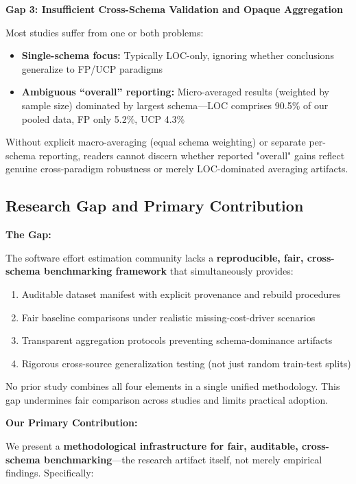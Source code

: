 \documentclass[11pt,a4paper]{article}
\begin{document}
\textbf{Gap 3: Insufficient Cross-Schema Validation and Opaque Aggregation}

Most studies suffer from one or both problems:
\begin{itemize}
    \item \textbf{Single-schema focus:} Typically LOC-only, ignoring whether conclusions generalize to FP/UCP paradigms
    \item \textbf{Ambiguous ``overall'' reporting:} Micro-averaged results (weighted by sample size) dominated by largest schema---LOC comprises 90.5\% of our pooled data, FP only 5.2\%, UCP 4.3\%
\end{itemize}

Without explicit macro-averaging (equal schema weighting) or separate per-schema reporting, readers cannot discern whether reported "overall" gains reflect genuine cross-paradigm robustness or merely LOC-dominated averaging artifacts.

\subsection{Research Gap and Primary Contribution}

\textbf{The Gap:}

The software effort estimation community lacks a \textbf{reproducible, fair, cross-schema benchmarking framework} that simultaneously provides:
\begin{enumerate}
    \item Auditable dataset manifest with explicit provenance and rebuild procedures
    \item Fair baseline comparisons under realistic missing-cost-driver scenarios
    \item Transparent aggregation protocols preventing schema-dominance artifacts
    \item Rigorous cross-source generalization testing (not just random train-test splits)
\end{enumerate}

No prior study combines all four elements in a single unified methodology. This gap undermines fair comparison across studies and limits practical adoption.

\textbf{Our Primary Contribution:}

We present a \textbf{methodological infrastructure for fair, auditable, cross-schema benchmarking}---the research artifact itself, not merely empirical findings. Specifically:
\end{document}
